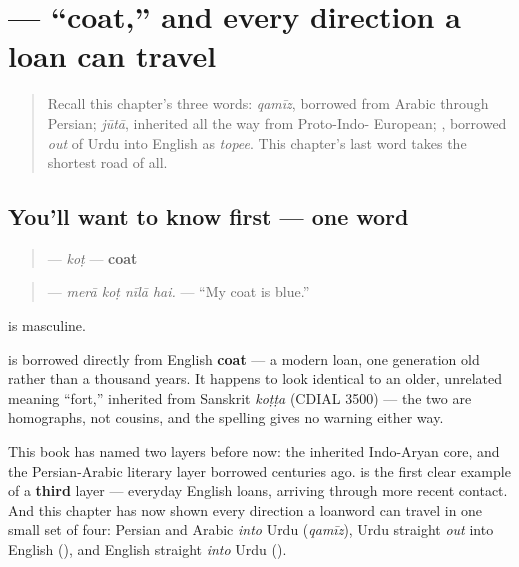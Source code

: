 \section[\texorpdfstring{\ur{کوٹ} (koṭ)}{کوٹ (koṭ)}]{ — \textquotedblleft{}coat,\textquotedblright{} and every direction a loan can travel}

\label{lesson:UR-C14-koat}



\begin{quote}
Recall this chapter's three words: \emph{qamīz}, borrowed from Arabic through Persian; \emph{jūtā}, inherited all the way from Proto-Indo- European; \textbf{}, borrowed \emph{out} of Urdu into English as \emph{topee}. This chapter's last word takes the shortest road of all.
\end{quote}

\subsection*{You'll want to know first — one word}
\begin{quote}
\textbf{} — \emph{koṭ} — \textbf{coat}
\end{quote}

\begin{quote}
\textbf{   } — \emph{merā koṭ nīlā hai.} — \textquotedblleft{}My coat is blue.\textquotedblright{}
\end{quote}

\textbf{} is masculine.

\begin{cousinweb}
\textbf{} is borrowed directly from English \textbf{coat} — a modern loan, one generation old rather than a thousand years. It happens to look identical to an older, unrelated \textbf{} meaning \textquotedblleft{}fort,\textquotedblright{} inherited from Sanskrit \emph{koṭṭa} (CDIAL 3500) — the two are homographs, not cousins, and the spelling gives no warning either way.

This book has named two layers before now: the inherited Indo-Aryan core, and the Persian-Arabic literary layer borrowed centuries ago. \textbf{} is the first clear example of a \textbf{third} layer — everyday English loans, arriving through more recent contact. And this chapter has now shown every direction a loanword can travel in one small set of four: Persian and Arabic \emph{into} Urdu (\emph{qamīz}), Urdu straight \emph{out} into English (\textbf{}), and English straight \emph{into} Urdu (\textbf{}).
\end{cousinweb}

